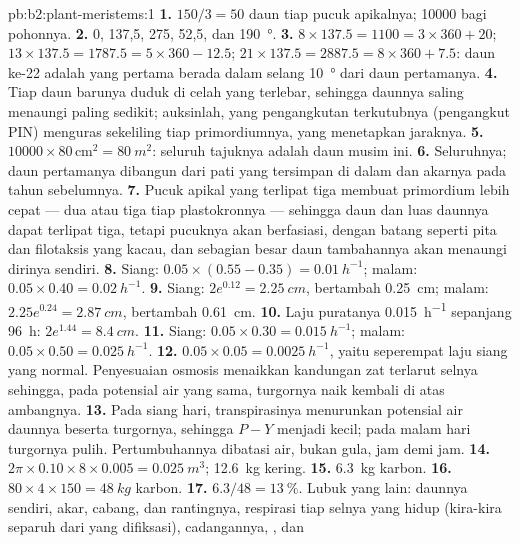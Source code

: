 \begin{solution}{pb:b2:plant-meristems:1}
\textbf{1.} $150/3 = 50$ daun tiap pucuk apikalnya; \num{10000} bagi
pohonnya.
\textbf{2.} 0, 137,5, 275, 52,5, dan \qty{190}{\degree}.
\textbf{3.} $8\times 137.5 = 1100 = 3\times 360 + 20$; $13\times 137.5
= 1787.5 = 5\times 360 - 12.5$; $21\times 137.5 = 2887.5 = 8\times 360
+ 7.5$: daun ke-22 adalah yang pertama berada dalam selang
\qty{10}{\degree} dari daun pertamanya.
\textbf{4.} Tiap daun barunya duduk di celah yang terlebar, sehingga
daunnya saling menaungi paling sedikit; auksinlah, yang pengangkutan
terkutubnya (pengangkut PIN) menguras sekeliling tiap primordiumnya,
yang menetapkan jaraknya.
\textbf{5.} $\num{10000}\times 80\,\text{cm}^{2} = \qty{80}{m^2}$:
seluruh tajuknya adalah daun musim ini.
\textbf{6.} Seluruhnya; daun pertamanya dibangun dari pati yang
tersimpan di dalam  dan akarnya pada tahun sebelumnya.
\textbf{7.} Pucuk apikal yang terlipat tiga membuat primordium lebih
cepat --- dua atau tiga tiap plastokronnya --- sehingga daun dan luas
daunnya dapat terlipat tiga, tetapi pucuknya akan berfasiasi, dengan
batang seperti pita dan filotaksis yang kacau, dan sebagian besar daun
tambahannya akan menaungi dirinya sendiri.
\textbf{8.} Siang: $0.05\times(0.55 - 0.35) = \qty{0.01}{h^{-1}}$;
malam: $0.05\times 0.40 = \qty{0.02}{h^{-1}}$.
\textbf{9.} Siang: $2e^{0.12} = \qty{2.25}{cm}$, bertambah
\qty{0.25}{cm}; malam: $2.25e^{0.24} = \qty{2.87}{cm}$, bertambah
\qty{0.61}{cm}.
\textbf{10.} Laju puratanya \qty{0.015}{h^{-1}} sepanjang \qty{96}{h}:
$2e^{1.44}
= \qty{8.4}{cm}$.
\textbf{11.} Siang: $0.05\times 0.30 = \qty{0.015}{h^{-1}}$; malam:
$0.05\times 0.50 = \qty{0.025}{h^{-1}}$.
\textbf{12.} $0.05\times 0.05 = \qty{0.0025}{h^{-1}}$, yaitu seperempat
laju siang yang normal. Penyesuaian osmosis menaikkan kandungan zat
terlarut selnya sehingga, pada potensial air yang sama, turgornya naik
kembali di atas ambangnya.
\textbf{13.} Pada siang hari, transpirasinya menurunkan potensial air
daunnya beserta turgornya, sehingga $P - Y$ menjadi kecil; pada malam
hari turgornya pulih. Pertumbuhannya dibatasi air, bukan gula, jam demi
jam.
\textbf{14.} $2\pi\times 0.10\times 8\times 0.005 = \qty{0.025}{m^3}$;
\qty{12.6}{kg} kering.
\textbf{15.} \qty{6.3}{kg} karbon.
\textbf{16.} $80\times 4\times 150 = \qty{48}{kg}$ karbon.
\textbf{17.} $6.3/48 = \qty{13}{\%}$. Lubuk yang lain: daunnya sendiri,
akar, cabang, dan rantingnya, respirasi tiap selnya yang hidup
(kira-kira separuh dari yang difiksasi), cadangannya, , dan

\end{solution}
